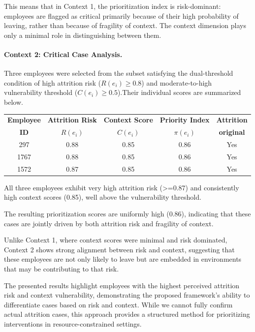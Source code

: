 \documentclass[runningheads]{llncs}
\begin{document}
This means that in Context 1, the prioritization index is risk-dominant: employees are flagged as critical primarily because of their high probability of leaving, rather than because of fragility of context. The context dimension plays only a minimal role in distinguishing between them.

\paragraph{Context 2: Critical Case Analysis.}
Three employees were selected from the subset satisfying the dual-threshold condition of high attrition risk ($R(e_i) \geq 0.8$) and moderate-to-high vulnerability threshold ($C(e_i) \geq 0.5$).Their individual scores are summarized below.

\begin{table}[h!]
\centering
\begin{tabular}{|c|c|c|c|c|}
\hline
\textbf{Employee} & \textbf{Attrition Risk } & \textbf{Context Score } & \textbf{Priority Index} & \textbf{Attrition} \\
\textbf{ID} & $R(e_i)$ & $C(e_i)$ & $\pi(e_i)$ &  \textbf{original} \\

\hline
297   & 0.88 & 0.85 & 0.86 & Yes\\
\hline
1767  & 0.88 & 0.85 & 0.86 & Yes\\
\hline
1572  & 0.87 & 0.85 & 0.86 & Yes\\
\hline
\end{tabular}
\end{table}


All three employees exhibit very high attrition risk (>=0.87) and consistently high context scores (0.85), well above the vulnerability threshold.

The resulting prioritization scores are uniformly high (0.86), indicating that these cases are jointly driven by both attrition risk and fragility of context.

Unlike Context 1, where context scores were minimal and risk dominated, Context 2 shows strong alignment between risk and context, suggesting that these employees are not only likely to leave but are embedded in environments that may be contributing to that risk.

The presented results highlight employees with the highest perceived attrition risk and context vulnerability, demonstrating the proposed framework's ability to differentiate cases based on risk and context. While we cannot fully confirm actual attrition cases, this approach provides a structured method for prioritizing interventions in resource-constrained settings.
\end{document}
